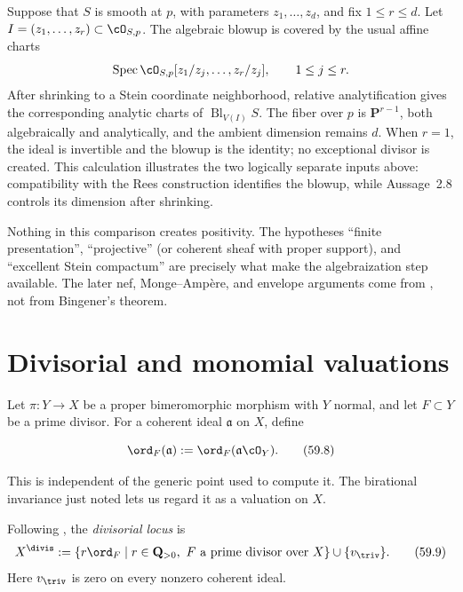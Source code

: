 \begin{example}
\label{ex:mp-stein-local-blowup}
Suppose that $S$ is smooth at $p$, with parameters $z_1,\ldots,z_d$,
and fix $1\leq r\leq d$. Let
$I=(z_1,\ldots,z_r)\subset\cO_{S,p}$.  The algebraic blowup is covered by
the usual affine charts
\[
 \operatorname{Spec}\cO_{S,p}
   [z_1/z_j,\ldots,z_r/z_j],
 \qquad 1\leq j\leq r.
\]
After shrinking to a Stein coordinate neighborhood, relative
analytification gives the corresponding analytic charts of
$\operatorname{Bl}_{V(I)}S$.  The fiber over $p$ is
$\mathbf P^{r-1}$, both algebraically and analytically, and the ambient
dimension remains $d$. When $r=1$, the ideal is invertible and the blowup
is the identity; no exceptional divisor is created.  This calculation illustrates the two logically
separate inputs above: compatibility with the Rees construction identifies
the blowup, while Aussage~2.8 controls its dimension after shrinking.
\end{example}

Nothing in this comparison creates positivity.  The hypotheses
``finite presentation'', ``projective'' (or coherent sheaf with proper
support), and ``excellent Stein compactum'' are precisely what make the
algebraization step available.  The later nef, Monge--Amp\`ere, and envelope
arguments come from \cite{MPTropicalV2,MPWN25}, not from Bingener's theorem.

\section{Divisorial and monomial valuations}
\label{sec:mp-dual-monomial}

Let $\pi:Y\to X$ be a proper bimeromorphic morphism with $Y$ normal,
and let $F\subset Y$ be a prime divisor.  For a coherent ideal
$\mathfrak a$ on $X$, define

\[
 \ord_F(\mathfrak a)
 :=\ord_F(\mathfrak a\cO_Y).
\tag{59.8}\label{eq:mp-divisorial-order}
\]

This is independent of the generic point used to compute it.  The
birational invariance just noted lets us regard it as a valuation on $X$.

\begin{definition}
\label{def:mp-divisorial-locus}
Following \cite[Definition~2.3.1]{MPTropicalV2}, the \emph{divisorial locus} is
\[
 X^{\divis}:=\{r\ord_F\mid r\in\mathbf Q_{>0},\ F
       \text{ a prime divisor over }X\}\cup\{v_{\triv}\}.
\tag{59.9}\label{eq:mp-divisorial-locus}
\]
Here $v_{\triv}$ is zero on every nonzero coherent ideal.
\end{definition}

